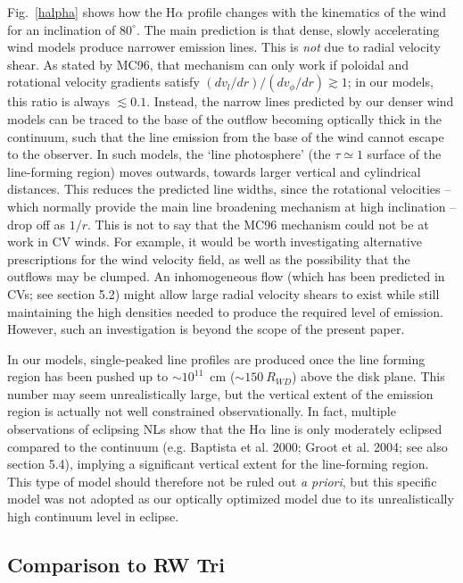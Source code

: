 \documentclass[preprint, a4paper, 11pt]{aastex}
\begin{document}
Fig.~\ref{halpha} shows how the H$\alpha$ profile changes with the kinematics of the wind for 
an inclination of $80^\circ$. The main prediction is that dense, slowly accelerating 
wind models produce narrower emission lines. This is {\em not} due to radial 
velocity shear. As stated by MC96, that mechanism can only work if poloidal 
and rotational velocity gradients satisfy $(dv_l/dr)/(dv_\phi/dr) \gtrsim 1$; in 
our models, this ratio is always $\lesssim 0.1$. Instead, the narrow lines predicted 
by our denser wind models can be traced to the base of the outflow becoming optically 
thick in the continuum, such that the line emission from the base of the wind
cannot escape to the observer. In such models, the `line photosphere'
(the $\tau \simeq 1$ surface of the line-forming region) moves outwards, towards larger 
vertical and cylindrical distances. This reduces the predicted line widths, since the 
rotational velocities -- which normally provide the main line broadening mechanism at 
high inclination -- drop off as $1/r$. This is not to say that the MC96 
mechanism could not be at work in CV winds. For example, it would be worth investigating
alternative prescriptions for the wind velocity field, as well as the possibility that the 
outflows may be clumped. An inhomogeneous flow 
(which has been predicted in CVs; see section 5.2)
might allow large radial velocity shears to exist while still 
maintaining the high densities needed to produce the required level of emission.
However, such an investigation is beyond the scope of the present paper.

In our models, single-peaked line profiles are produced once the line forming region has been
pushed up to $\sim 10^{11}$~cm ($\sim150~R_{WD}$) above the disk plane. 
This number may seem unrealistically large, but the vertical extent of 
the emission region is actually not well constrained observationally. 
In fact, multiple observations of eclipsing NLs show that the H$\alpha$ 
line is only moderately eclipsed compared to the continuum (e.g. Baptista et al. 2000;
Groot et al. 2004; see also section 5.4), 
implying a significant vertical extent for the line-forming 
region. This type of model should therefore not be ruled out {\em a priori}, 
but this specific model was not adopted as our optically optimized model
due to its unrealistically high continuum level in eclipse. 


\subsection{Comparison to RW Tri}
\end{document}
